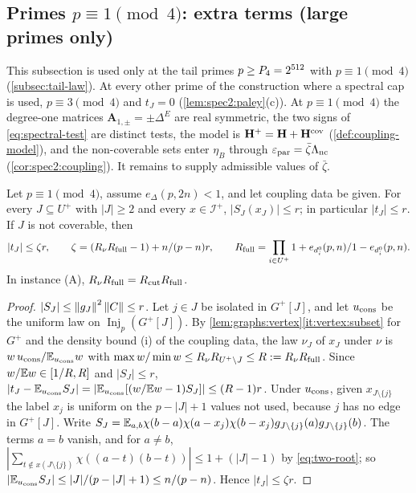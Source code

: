 \subsection{Primes \texorpdfstring{$p\equiv1\pmod4$}{p = 1 (mod 4)}: extra terms (large primes only)}\label{subsec:advance:parity}

This subsection is used only at the tail primes $p\ge\Pfour=2^{512}$ with
$p\equiv1\pmod4$ (\cref{subsec:tail-law}). At every other prime of the construction
where a spectral cap is used, $p\equiv3\pmod4$ and $t_J=0$
(\cref{lem:spec2:paley}(c)). At $p\equiv1\pmod4$ the degree-one matrices
$\mathbf A_{1,\pm}=\pm\Delta^E$ are real symmetric, the two signs of
\eqref{eq:spectral-test} are distinct tests, the model is $\Hmat^+=\Hmat+\Hmat^{\rm cov}$
(\cref{def:coupling-model}), and the non-coverable sets enter $\eta_B$ through
$\eps_{\rm par}=\bar\zeta\Lambda_{\rm nc}$ (\cref{cor:spec2:coupling}). It remains to supply
admissible values of $\bar\zeta$.

\begin{lemma}\label{lem:spec2:paley-one}
Let $p\equiv1\pmod4$, assume $e_\Delta(p,2n)<1$, and let coupling data be given. For
every $J\subseteq U^+$ with $|J|\ge2$ and every $x\in\mathcal I^+$, $|S_J(x_J)|\le r$; in
particular $|t_J|\le r$. If $J$ is not coverable, then
\[
  |t_J|\le\zeta r,\qquad \zeta=(R_\nu R_{\rm full}-1)+\frac n{(p-n)r},\qquad
  R_{\rm full}=\prod_{i\in U^+}\frac{1+e_{d^0_i}(p,n)}{1-e_{d^0_i}(p,n)} .
\]
In instance \textup{(A)}, $R_\nu R_{\rm full}=\Rcut R_{\rm full}$.
\end{lemma}

\begin{proof}
$|S_J|\le\norm{g_J}^2\norm C\le r$. Let $j\in J$ be isolated in $G^+[J]$, and let
$u_{\rm cons}$ be the uniform law on $\operatorname{Inj}_p(G^+[J])$. By
\cref{lem:graphs:vertex}\ref{it:vertex:subset} for $G^+$ and the density bound (i) of
the coupling data, the law $\nu_J$ of $x_J$ under $\nu$ is $w\,u_{\rm cons}/\E_{u_{\rm cons}}w$
with $\max w/\min w\le R_\nu R_{U^+\setminus J}\le R:=R_\nu R_{\rm full}$. Since
$w/\E w\in[1/R,R]$ and $|S_J|\le r$,
$|t_J-\E_{u_{\rm cons}}S_J|=|\E_{u_{\rm cons}}[(w/\E w-1)S_J]|\le(R-1)r$. Under $u_{\rm cons}$, given
$x_{J\setminus\{j\}}$ the label $x_j$ is uniform on the $p-|J|+1$ values not used, because
$j$ has no edge in $G^+[J]$. Write $S_J=\E_{a,b}\chi(b-a)\chi(a-x_j)\chi(b-x_j)
g_{J\setminus\{j\}}(a)g_{J\setminus\{j\}}(b)$. The terms $a=b$ vanish, and for $a\ne b$,
$|\sum_{t\notin x(J\setminus\{j\})}\chi((a-t)(b-t))|\le1+(|J|-1)$ by \eqref{eq:two-root}; so
$|\E_{u_{\rm cons}}S_J|\le|J|/(p-|J|+1)\le n/(p-n)$. Hence $|t_J|\le\zeta r$.
\end{proof}

